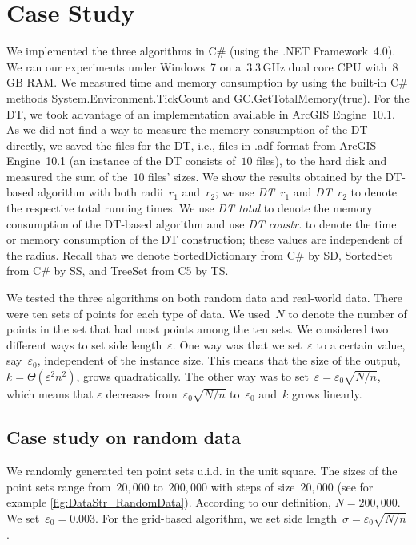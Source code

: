 \section{Case Study}\label{sec:DataStr_CaseStudy}
We implemented the three algorithms 
in C\# (using the .NET Framework~4.0).
We ran our experiments under 
Windows~7 on a~$3.3\,$GHz dual core CPU with~$8\,$GB RAM. 
We measured time and memory consumption by using 
the built-in C\# methods System.Environment.TickCount 
and GC.GetTotalMemory(true). 
For the DT, we took advantage of 
an implementation available in ArcGIS Engine~10.1.
As we did not find a way 
to measure the memory consumption of the DT directly, 
we saved the files for the DT, i.e., files in .adf format 
from ArcGIS Engine~10.1 
(an instance of the DT consists of~$10$ files), 
to the hard disk and 
measured the sum of the~$10$ files' sizes. 
We show the results obtained by the DT-based algorithm 
with both radii~$r_{1}$ and~$r_{2}$; 
we use \emph{DT~$r_1$} and \emph{DT~$r_2$} 
to denote the respective total running times. 
We use \emph{DT total} to denote 
the memory consumption of the DT-based algorithm 
and use \emph{DT constr.} to denote 
the time or memory consumption of the DT construction; 
these values are independent of the radius.
Recall that we denote SortedDictionary from C\# by SD,
SortedSet from C\# by SS, and TreeSet from C5 by TS.

We tested the three algorithms on both random data and 
real-world data. 
There were ten sets of points for each type of data. 
We used~$N$ to denote the number of points 
in the set that had most points among the ten sets. 
We considered two different ways 
to set side length~$\varepsilon$. 
One way was that we set~$\varepsilon$ to a certain value, 
say~$\varepsilon_{0}$, independent of the instance size. 
This means that the size of the output, 
$k=\Theta (\varepsilon ^{2}n^{2})$, grows quadratically. 
The other way was to set~$\varepsilon =\varepsilon_{0}\sqrt{N/n}$, 
which means that $\varepsilon$ decreases 
from~$\varepsilon_{0}\sqrt{N/n}$ to~$\varepsilon_{0}$ 
and~$k$ grows linearly.



\subsection{Case study on random data}
\label{sec:DataStr_CaseStudy_RandomData} 
We randomly generated ten point sets u.i.d. 
in the unit square. 
The sizes of the point sets range 
from~$20{,}000$ to~$200{,}000$ 
with steps of size~$20{,}000$
(see for example \fig\ref{fig:DataStr_RandomData}).
According to our definition, $N=200{,}000$. 
We set~$\varepsilon_{0}=0.003$. 
For the grid-based algorithm,
we set side length~$\sigma=\varepsilon_{0}\sqrt{N/n}$.

